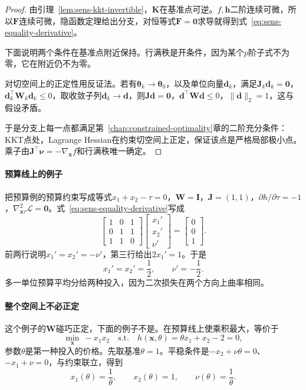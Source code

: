 \begin{proof}
由引理~\ref{lem:sens-kkt-invertible}，$\bm{K}$在基准点可逆。$f,\bm{h}$二阶连续可微，所以$\bm{F}$连续可微，隐函数定理给出分支，对恒等式$\bm{F}=\bm{0}$求导就得到式~\eqref{eq:sens-equality-derivative}。

下面说明两个条件在基准点附近保持。行满秩是开条件，因为某个$p$阶子式不为零，它在附近仍不为零。

对切空间上的正定性用反证法。若有$\bm{\theta}_k\to\bm{\theta}_0$，以及单位向量$\bm{d}_k$，满足$\bm{J}_k\bm{d}_k=\bm{0}$，$\bm{d}_k^{\top}\bm{W}_k\bm{d}_k\leq0$，取收敛子列$\bm{d}_k\to\bm{d}$，则$\bm{J}\bm{d}=\bm{0}$，$\bm{d}^{\top}\bm{W}\bm{d}\leq0$，$\lVert\bm{d}\rVert_2=1$，这与假设矛盾。

于是分支上每一点都满足第~\ref{chap:constrained-optimality}章的二阶充分条件：KKT点处，Lagrange Hessian在约束切空间上正定，保证该点是严格局部极小点。乘子由$\bm{J}^{\top}\bm{\nu}=-\nabla_{\bm{x}}f$和行满秩唯一确定。
\end{proof}

\paragraph{预算线上的例子}
把预算例的预算约束写成等式$x_1+x_2-\tau=0$，$\bm{W}=\bm{I}$，$\bm{J}=(1,1)$，$\partial h/\partial\tau=-1$，$\nabla^2_{\bm{x}\tau}\mathcal{L}=\bm{0}$。式~\eqref{eq:sens-equality-derivative}写成
\[
 \begin{bmatrix}1&0&1\\0&1&1\\1&1&0\end{bmatrix}
 \begin{bmatrix}x_1'\\x_2'\\\nu'\end{bmatrix}
 =\begin{bmatrix}0\\0\\1\end{bmatrix}.
\]
前两行说明$x_1'=x_2'=-\nu'$，第三行给出$2x_1'=1$。于是
\[
 x_1'=x_2'=\frac12,\qquad\nu'=-\frac12.
\]
多一单位预算平均分给两种投入，因为二次损失在两个方向上曲率相同。

\paragraph{整个空间上不必正定}
这个例子的$\bm{W}$碰巧正定，下面的例子不是。在预算线上使乘积最大，等价于
\[
 \min_{\bm{x}}\ -x_1x_2\quad\text{s.t.}\quad h(\bm{x},\theta)=\theta x_1+x_2-2=0,
\]
参数$\theta$是第一种投入的价格。先取基准$\theta=1$。平稳条件是$-x_2+\nu\theta=0$、$-x_1+\nu=0$，与约束联立，得到
\[
 x_1(\theta)=\frac{1}{\theta},\qquad x_2(\theta)=1,\qquad\nu(\theta)=\frac{1}{\theta}.
\]

